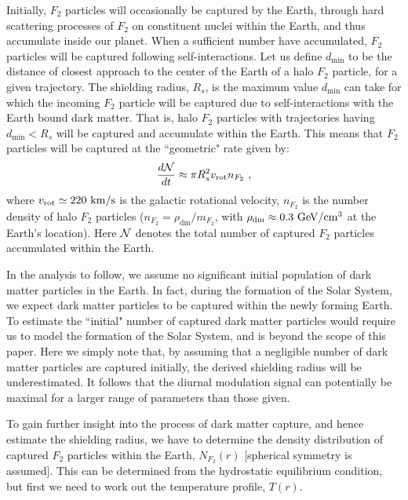 \documentclass[12pt]{article}
\begin{document}
Initially, $F_2$ particles will occasionally be captured by the Earth, through hard scattering processes of $F_2$ on constituent nuclei within the Earth, and thus accumulate inside our planet. When a sufficient number have accumulated, $F_2$ particles will be captured following self-interactions. Let us define $d _{\min}$ to be the distance of closest approach to the center of the Earth of a halo $F_2$ particle, for a given trajectory. The shielding radius, $R_s$, is the maximum value $d _{\min}$ can take for which the incoming $F_2$ particle will be captured due to self-interactions with the Earth bound dark matter. That is, halo $F_2$ particles with trajectories having $d _{\min}<R _s$ will be captured and accumulate within the Earth. This means that $F_2$ particles will be captured at the ``geometric" rate given by:
%
\begin{eqnarray}
\frac{d{\cal N}}{dt} \approx \pi R _s ^2v _{\text{rot}}n _{F_2} \ ,
\end{eqnarray}
%
where $v _{\text{rot}} \simeq 220 \ \rm km/s$ is the galactic rotational velocity, $n _{F_2}$ is the number density of halo $F_2$ particles ($n _{F_2} = \rho _{\text{dm}}/m _{F_2}$, with $\rho _{\text{dm}} \approx 0.3 \ \rm GeV/cm ^3$ at the Earth's location). Here ${\cal N}$ denotes the total number of captured $F_2$ particles accumulated within the Earth.

In the analysis to follow, we assume no significant initial population of dark matter particles in the Earth. In fact, during the formation of the Solar System, we expect dark matter particles to be captured within the newly forming Earth. To estimate the ``initial" number of captured dark matter particles would require us to model the formation of the Solar System, and is beyond the scope of this paper. Here we simply note that, by assuming that a negligible number of dark matter particles are captured initially, the derived shielding radius will be underestimated. It follows that the diurnal modulation signal can potentially be maximal for a larger range of parameters than those given.

To gain further insight into the process of dark matter capture, and hence estimate the shielding radius, we have to determine the density distribution of captured $F_2$ particles within the Earth, $N _{F_2}(r)$ [spherical symmetry is assumed]. This can be determined from the hydrostatic equilibrium condition, but first we need to work out the temperature profile, $T(r)$.
\end{document}

